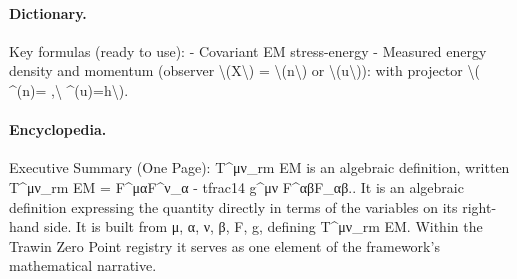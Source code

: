 \paragraph{Dictionary.}
Key formulas (ready to use): - Covariant EM stress-energy - Measured energy density and momentum (observer \textbackslash{}(X\textbackslash{}) = \textbackslash{}(n\textbackslash{}) or \textbackslash{}(u\textbackslash{})): with projector \textbackslash{}( \textasciicircum{}(n)= ,\textbackslash{} \textasciicircum{}(u)=h\textbackslash{}).

\paragraph{Encyclopedia.}
Executive Summary (One Page): T\textasciicircum{}μν\_rm EM is an algebraic definition, written T\textasciicircum{}μν\_rm EM = F\textasciicircum{}μαF\textasciicircum{}ν\_α - tfrac14 g\textasciicircum{}μν F\textasciicircum{}αβF\_αβ.. It is an algebraic definition expressing the quantity directly in terms of the variables on its right-hand side. It is built from μ, α, ν, β, F, g, defining T\textasciicircum{}μν\_rm EM. Within the Trawin Zero Point registry it serves as one element of the framework's mathematical narrative.
